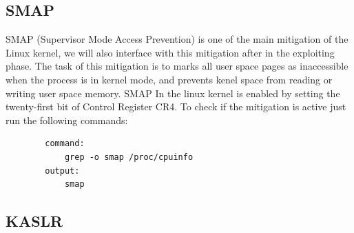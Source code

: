     \subsection{SMAP}
    SMAP (Supervisor Mode Access Prevention) is one of the main mitigation of the Linux kernel, we will also interface with this mitigation after in the exploiting phase.\newline
    The task of this mitigation is to marks all user space pages as inaccessible when the process is in kernel mode, and prevents kenel space from reading or writing user space memory.\newline
    SMAP In the linux kernel is enabled by setting the twenty-first bit of Control Register CR4.\newline
    To check if the mitigation is active just run the following commands: \newline
      \begin{verbatim}
        command:
            grep -o smap /proc/cpuinfo
        output: 
            smap
    \end{verbatim}
    \subsection{KASLR}

